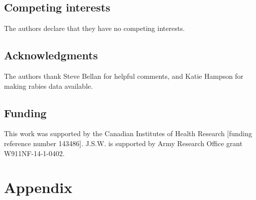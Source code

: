 \documentclass[12pt]{article}
\begin{document}
\subsection*{Competing interests}

The authors declare that they have no competing interests.

\subsection*{Acknowledgments}

The authors thank Steve Bellan for helpful comments, and Katie Hampson for making rabies data available.

\subsection*{Funding}

This work was supported by the Canadian Institutes of Health Research [funding reference number 143486]. J.S.W. is supported by Army Research Office grant W911NF-14-1-0402.

\printbibliography

\clearpage

\section{Appendix}


\end{document}
